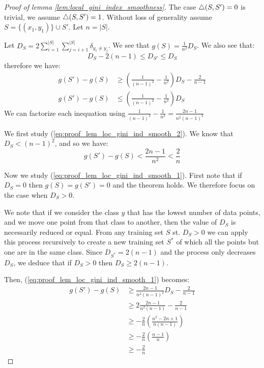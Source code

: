 \begin{proof}[Proof of lemma \ref{lem:local_gini_index_smoothness}]
    The case $\triangle(S, S') = 0$ is trivial, we assume $\triangle(S, S') = 1$. Without loss of generality assume $S = \{(x_1, y_1)\} \cup S'$. Let $n = |S|$.
    
    Let $D_S = 2\sum_{i=1}^{|S|}\sum_{j=i+1}^{|S|} \delta_{y_i \neq y_j}$. We see that $g(S) = \frac{1}{n^2}D_S$. We also see that:
    \begin{equation*}
        D_S - 2(n-1) \leq D_{S'} \leq D_S
    \end{equation*}
    therefore we have:
    \begin{align}
        g(S') - g(S) &\geq \left(\frac{1}{(n-1)^2} - \frac{1}{n^2}\right)D_S - \frac{2}{n-1}\label{eq:proof_lem_loc_gini_ind_smooth_1}\\
        g(S') - g(S) &\leq \left(\frac{1}{(n-1)^2} - \frac{1}{n^2}\right)D_S\label{eq:proof_lem_loc_gini_ind_smooth_2}
    \end{align}
    We can factorize each inequation using $\frac{1}{(n-1)^2} - \frac{1}{n^2} = \frac{2n-1}{n^2(n-1)^2}$

    We first study (\ref{eq:proof_lem_loc_gini_ind_smooth_2}). We know that $D_S < (n-1)^2$, and so we have:
    \begin{equation*}
        g(S') - g(S) < \frac{2n-1}{n^2} < \frac{2}{n}
    \end{equation*}

    Now we study (\ref{eq:proof_lem_loc_gini_ind_smooth_1}). First note that if $D_S = 0$ then $g(S) = g(S') = 0$ and the theorem holds. We therefore focus on the case when $D_S > 0$.

    We note that if we consider the class $y$ that has the lowest number of data points, and we move one point from that class to another, then the value of $D_S$ is necessarily reduced or equal. From any training set $S$ st. $D_S > 0$ we can apply this process recursively to create a new training set $S^*$ of which all the points but one are in the same class. Since $D_{S^*} = 2(n-1)$ and the process only decreases $D_S$, we deduce that if $D_S > 0$ then $D_S \geq 2(n-1)$.

    Then, (\ref{eq:proof_lem_loc_gini_ind_smooth_1}) becomes:
    \begin{equation*}
        \begin{split}
            g(S') - g(S) &\geq \frac{2n-1}{n^2(n-1)^2} D_S - \frac{2}{n-1}\\
            &\geq 2\frac{2n-1}{n^2(n-1)} - \frac{2}{n-1}\\
            &\geq -\frac{2}{n}\left(\frac{n^2 - 2n + 1}{n (n-1)}\right)\\
            &\geq -\frac{2}{n}\left(\frac{n-1}{n}\right)\\
            &\geq -\frac{2}{n}
        \end{split}
    \end{equation*}
\end{proof}


